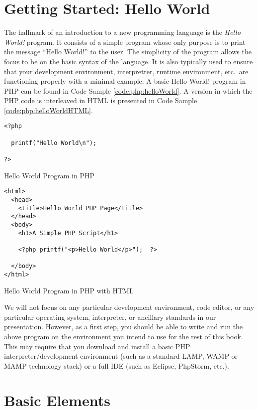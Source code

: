 \section{Getting Started: Hello World}

The hallmark of an introduction to a new programming language is the 
\emph{Hello World!} program.  It consists of a simple program whose 
only purpose is to print the message ``Hello World!'' to the user.  
The simplicity of the program allows the focus to be on the basic syntax 
of the language.  It is also typically used to ensure that 
your development environment, interpretrer, runtime environment, 
etc.\ are functioning properly with a minimal example.  A basic Hello World! program in PHP can be found in Code Sample \ref{code:php:helloWorld}.  
A version in which the PHP code is interleaved in HTML is presented in 
Code Sample \ref{code:php:helloWorldHTML}.

\begin{listing}
\begin{verbatim}
<?php

  printf("Hello World\n");

?>
\end{verbatim}
\caption{Hello World Program in PHP}
\label{code:php:helloWorld}
\end{listing}

\begin{listing}
\begin{verbatim}
<html>
  <head>
    <title>Hello World PHP Page</title>
  </head>
  <body>
    <h1>A Simple PHP Script</h1>

    <?php printf("<p>Hello World</p>");  ?>
    
  </body>
</html>
\end{verbatim}
\caption{Hello World Program in PHP with HTML}
\label{code:php:helloWorldHTML}
\end{listing}

We will not focus on any particular development environment, code editor, 
or any particular operating system, interpreter, or ancillary standards in our 
presentation.  However, as a first step, you should be able to write and run the 
above program on the environment you intend to use for the rest of this book.  
This may require that you download
and install a basic PHP interpreter/development environment (such as a standard 
LAMP, WAMP or MAMP technology stack) or a full IDE (such as Eclipse, PhpStorm, etc.).

\section{Basic Elements}

